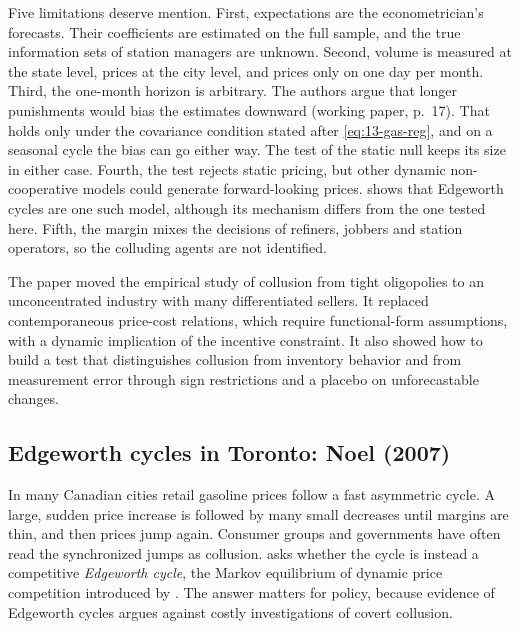 Five limitations deserve mention. First, expectations are the econometrician's forecasts. Their coefficients are
estimated on the full sample, and the true information sets of station managers are unknown. Second, volume is
measured at the state level, prices at the city level, and prices only on one day per month. Third, the
one-month horizon is arbitrary. The authors argue that longer punishments would bias the estimates downward
(working paper, p.~17). That holds only under the covariance condition stated after \eqref{eq:13-gas-reg}, and on
a seasonal cycle the bias can go either way. The test of the static null keeps its size in either case. Fourth, the test rejects static pricing, but other dynamic
non-cooperative models could generate forward-looking prices.  shows that Edgeworth cycles are one
such model, although its mechanism differs from the one tested here. Fifth, the margin mixes the decisions of
refiners, jobbers and station operators, so the colluding agents are not identified.

The paper moved the empirical study of collusion from tight oligopolies to an unconcentrated industry with many
differentiated sellers. It replaced contemporaneous price-cost relations, which require functional-form
assumptions, with a dynamic implication of the incentive constraint. It also showed how to build a test that
distinguishes collusion from inventory behavior and from measurement error through sign restrictions and a
placebo on unforecastable changes.

\subsection{Edgeworth cycles in Toronto: Noel (2007)}\label{sec:13-noel}

In many Canadian cities retail gasoline prices follow a fast asymmetric cycle. A large, sudden price increase is
followed by many small decreases until margins are thin, and then prices jump again. Consumer groups and
governments have often read the synchronized jumps as collusion. \citet{Noel2007} asks whether the cycle is
instead a competitive \emph{Edgeworth cycle}, the Markov equilibrium of dynamic price competition introduced by
\citet{MaskinTirole1988}. The answer matters for policy, because evidence of Edgeworth cycles argues against
costly investigations of covert collusion.

